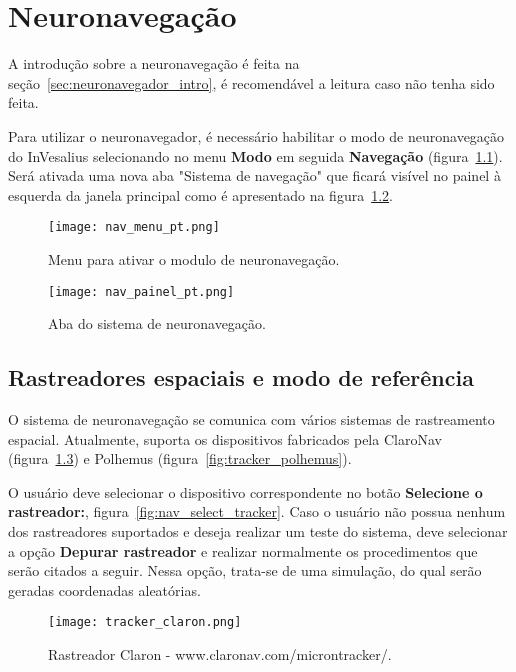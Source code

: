 \chapter{Neuronavegação}
\label{sec:neuronavegador}

A introdução sobre a neuronavegação é feita na seção~\ref{sec:neuronavegador_intro}, é recomendável a leitura caso não tenha sido feita.

Para utilizar o neuronavegador, é necessário habilitar o modo de neuronavegação do InVesalius selecionando no menu \textbf{Modo} em seguida \textbf{Navegação} (figura~\ref{fig:nav_menu_pt}). Será ativada uma nova aba "Sistema de navegação" que ficará visível no painel à esquerda da janela principal como é apresentado na figura~\ref{fig:nav_painel_pt}.

\begin{figure}[!htb]
\centering
\texttt{[image: nav\_menu\_pt.png]}
\caption{Menu para ativar o modulo de neuronavegação.}
\label{fig:nav_menu_pt}
\end{figure}

\begin{figure}[!htb]
\centering
\texttt{[image: nav\_painel\_pt.png]}
\caption{Aba do sistema de neuronavegação.}
\label{fig:nav_painel_pt}
\end{figure}

\section{Rastreadores espaciais e modo de referência}

O sistema de neuronavegação se comunica com vários sistemas de rastreamento espacial. Atualmente, suporta os dispositivos fabricados pela ClaroNav (figura~\ref{fig:tracker_claron}) e Polhemus (figura~\ref{fig:tracker_polhemus}). 

O usuário deve selecionar o dispositivo correspondente no botão \textbf{Selecione o rastreador:}, figura~\ref{fig:nav_select_tracker}.  Caso o usuário não possua nenhum dos rastreadores suportados e deseja realizar um teste do sistema, deve selecionar a opção \textbf{Depurar rastreador} e realizar normalmente os procedimentos que serão citados a seguir. Nessa opção, trata-se de uma simulação, do qual serão geradas coordenadas aleatórias.

\begin{figure}[!htb]
\centering
\texttt{[image: tracker\_claron.png]}
\caption{Rastreador Claron - www.claronav.com/microntracker/.}
\label{fig:tracker_claron}
\end{figure}

